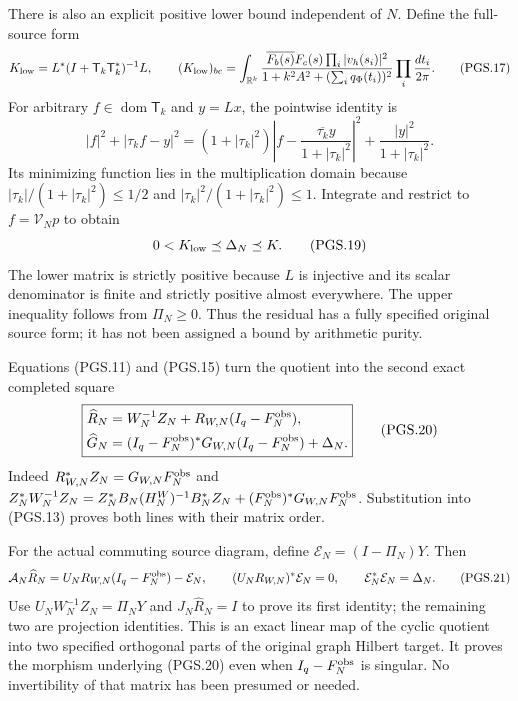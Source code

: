 There is also an explicit positive lower bound independent of \(N\).
Define the full-source form
\[
 K_{\rm low}=L^*(I+\mathsf T_k\mathsf T_k^*)^{-1}L,\qquad
 (K_{\rm low})_{bc}=\int_{\mathbb{R}^k}
   \frac{\overline{F_b(s)}F_c(s)
          \prod_i|v_h(s_i)|^2}
        {1+k^2A^2+(\sum_iq_\Phi(t_i))^2}
                  \prod_i\frac{dt_i}{2\pi}.
\tag{PGS.17}\label{eq:pgs-residual-bound}
\]
For arbitrary \(f\in\operatorname{dom}\mathsf T_k\) and \(y=Lx\),
the pointwise identity is
\[
 |f|^2+|\tau_k f-y|^2
  =(1+|\tau_k|^2)
       \left|f-\frac{\overline{\tau_k}y}{1+|\tau_k|^2}\right|^2
          +\frac{|y|^2}{1+|\tau_k|^2}.
\tag{PGS.18}\label{eq:pgs-pointwise-square}
\]
Its minimizing function lies in the multiplication domain because
\(|\tau_k|/(1+|\tau_k|^2)\le1/2\) and
\(|\tau_k|^2/(1+|\tau_k|^2)\le1\). Integrate and restrict to
\(f=\mathcal V_Np\) to obtain
\[
 0<K_{\rm low}\preceq\Delta_N\preceq K.
\tag{PGS.19}\label{eq:pgs-uniform-N}
\]
The lower matrix is strictly positive because \(L\) is injective
and its scalar denominator is finite and strictly positive almost
everywhere. The upper inequality follows from \(\Pi_N\ge0\).
Thus the residual has a fully specified original source form; it
has not been assigned a bound by arithmetic purity.

Equations (PGS.11) and (PGS.15) turn the quotient into the second
exact completed square
\[
\boxed{\begin{aligned}
 \widehat R_N&=W_N^{-1}Z_N+
                   R_{W,N}(I_q-F_N^{\rm obs}),\\
 \widehat G_N&=(I_q-F_N^{\rm obs})^*G_{W,N}
                   (I_q-F_N^{\rm obs})+\Delta_N.
\end{aligned}}
\tag{PGS.20}\label{eq:pgs-quotient-square}
\]
Indeed \(R_{W,N}^*Z_N=G_{W,N}F_N^{\rm obs}\) and
\(Z_N^*W_N^{-1}Z_N=Z_N^*B_N(H_N^W)^{-1}B_N^*Z_N
 +(F_N^{\rm obs})^*G_{W,N}F_N^{\rm obs}\).
Substitution into (PGS.13) proves both lines with their matrix order.

For the actual commuting source diagram, define
\(\mathcal E_N=(I-\Pi_N)Y\). Then
\[
 \mathcal A_N\widehat R_N
       =U_NR_{W,N}(I_q-F_N^{\rm obs})-\mathcal E_N,\qquad
 (U_NR_{W,N})^*\mathcal E_N=0,\qquad
 \mathcal E_N^*\mathcal E_N=\Delta_N.
\tag{PGS.21}\label{eq:pgs-orthogonal-source-map}
\]
Use \(U_NW_N^{-1}Z_N=\Pi_NY\) and \(J_N\widehat R_N=I\)
to prove its first identity; the remaining two are projection
identities. This is an exact linear map of the cyclic quotient into
two specified orthogonal parts of the original graph Hilbert target.
It proves the morphism underlying (PGS.20) even when
\(I_q-F_N^{\rm obs}\) is singular. No invertibility of that matrix
has been presumed or needed.

